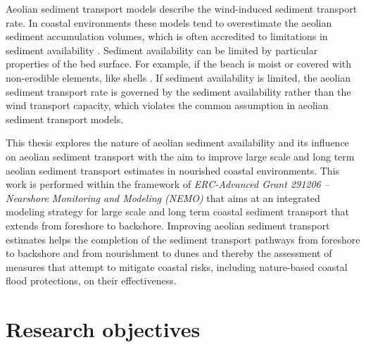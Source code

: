 Aeolian sediment transport models describe the wind-induced sediment
transport rate. In coastal environments these models tend to
overestimate the aeolian sediment accumulation volumes, which is often
accredited to limitations in sediment availability \citep{Houser2009,
  DelgadoFernandez2012, deVries2014b}. Sediment availability can be
limited by particular properties of the bed surface. For example, if
the beach is moist or covered with non-erodible elements, like shells
\citep{Wiggs2004, Edwards2009, Namikas2010, McKennaNeuman2012}. If
sediment availability is limited, the aeolian sediment transport rate
is governed by the sediment availability rather than the wind
transport capacity, which violates the common assumption in aeolian
sediment transport models.

This thesis explores the nature of aeolian sediment availability and
its influence on aeolian sediment transport with the aim to improve
large scale and long term aeolian sediment transport estimates in
nourished coastal environments. This work is performed within the
framework of \emph{ERC-Advanced Grant 291206 -- Nearshore Monitoring
  and Modeling (NEMO)} that aims at an integrated modeling strategy
for large scale and long term coastal sediment transport that extends
from foreshore to backshore. Improving aeolian sediment transport
estimates helps the completion of the sediment transport pathways from
foreshore to backshore and from nourishment to dunes and thereby the
assessment of measures that attempt to mitigate coastal risks,
including nature-based coastal flood protections, on their
effectiveness.



\section{Research objectives}

